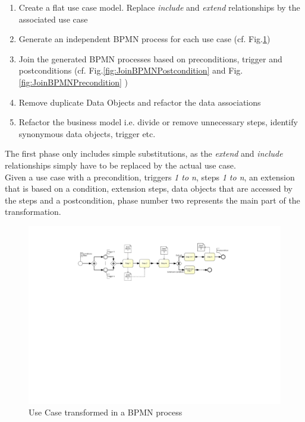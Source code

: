 \begin{enumerate}
	\item Create a flat use case model. Replace \textit{include} and \textit{extend} relationships by the associated use case
	\item Generate an independent BPMN process for each use case (cf. Fig.\ref{fig:useCaseTransformation})
	\item Join the generated BPMN processes based on preconditions, trigger and postconditions (cf. Fig.\ref{fig:JoinBPMNPostcondition} and Fig.\ref{fig:JoinBPMNPrecondition} )
	\item Remove duplicate Data Objects and refactor the data associations
	\item Refactor the business model i.e. divide or remove unnecessary steps, identify synonymous data objects, trigger etc.
\end{enumerate}


\noindent
The first phase only includes simple substitutions, as the \textit{extend} and \textit{include} relationships simply have to be replaced by the actual use case.\\
Given a use case with a precondition, triggers \textit{1 to n}, steps \textit{1 to n}, an extension that is based on a condition, extension steps, data objects that are accessed by the steps and a postcondition, phase number two represents the main part of the transformation.  


\begin{figure}[h!]
	\includegraphics[width=\textwidth, trim={6cm 14.5cm 6cm 1.5cm}]{img/usecaseTransformation.pdf}
	\caption{Use Case transformed in a BPMN process}
	\label{fig:useCaseTransformation}
\end{figure}

